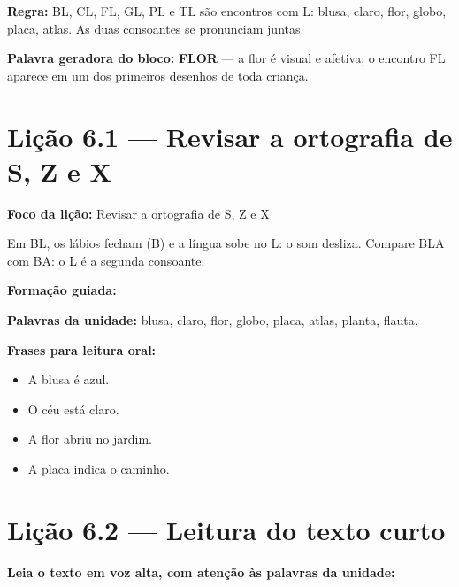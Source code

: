 \textbf{Regra:} BL, CL, FL, GL, PL e TL são encontros com L: blusa, claro, flor, globo, placa, atlas. As duas consoantes se pronunciam juntas.

\textbf{Palavra geradora do bloco:} \textbf{FLOR} --- a flor é visual e afetiva; o encontro FL aparece em um dos primeiros desenhos de toda criança.

\section{Lição 6.1 --- Revisar a ortografia de S, Z e X}

\textbf{Foco da lição:} Revisar a ortografia de S, Z e X


\begin{boquinha}
Em BL, os lábios fecham (B) e a língua sobe no L: o som desliza. Compare BLA com BA: o L é a segunda consoante.
\end{boquinha}

\noindent\textbf{Formação guiada:}

\begin{center}
\end{center}

\noindent\textbf{Palavras da unidade:} blusa, claro, flor, globo, placa, atlas, planta, flauta.

\noindent\textbf{Frases para leitura oral:}
\begin{itemize}[leftmargin=1.6em]
  \item A blusa é azul.
  \item O céu está claro.
  \item A flor abriu no jardim.
  \item A placa indica o caminho.
\end{itemize}

\section{Lição 6.2 --- Leitura do texto curto}

\noindent\textbf{Leia o texto em voz alta, com atenção às palavras da unidade:}


